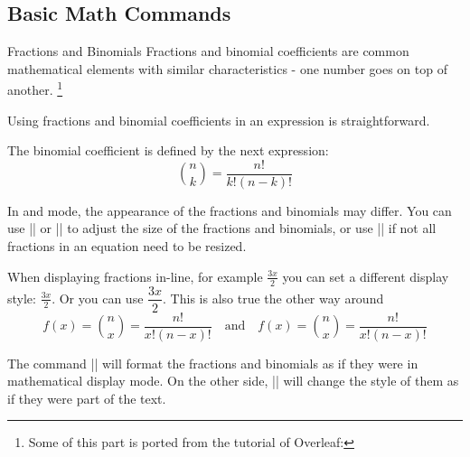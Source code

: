 \subsection{Basic Math Commands}

\begin{frame}[fragile]{Fractions and Binomials}
Fractions and binomial coefficients are common mathematical elements with similar characteristics - one number goes on top of another. \footnote[1]{Some of this part is ported from the tutorial of Overleaf: } 

\begin{command}
\begin{LCL}
\end{LCL}
\end{command}

Using fractions and binomial coefficients in an expression is straightforward.

\begin{latexexample}
The binomial coefficient is defined by the next expression:
\[ \binom{n}{k} = \frac{n!}{k!(n-k)!} \]
\end{latexexample}

\end{frame}

\begin{frame}[fragile]

In  and  mode, the appearance of the fractions and binomials may differ. You can use \LC|\displaystyle| or \LC|\textstyle| to adjust the size of the fractions and binomials, or use \LC|\dfrac| if not all fractions in an equation need to be resized.

\begin{latexexample}
When displaying fractions in-line, for example $\frac{3x}{2}$
you can set a different display style:  $ \displaystyle \frac{3x}{2} $.
Or you can use $\dfrac{3x}{2}$. This is also true the other way around
\[ f(x)=\binom{n}{x}=\frac{n!}{x!(n-x)!} \quad \textrm{and} \quad
   f(x)=\textstyle\binom{n}{x}=\frac{n!}{x!(n-x)!} \]
\end{latexexample}

The command \LC|\displaystyle| will format the fractions and binomials as if they were in mathematical display mode. On the other side, \LC|\textstyle| will change the style of them as if they were part of the text.

\end{frame}

